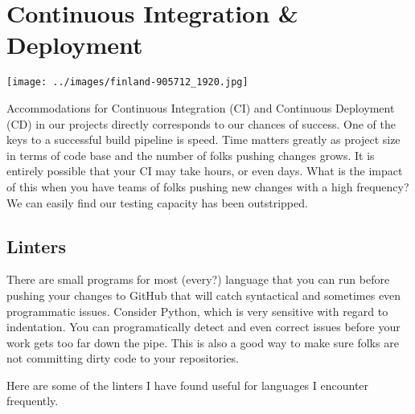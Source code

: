\chapter{Continuous Integration \& Deployment}

\texttt{[image: ../images/finland-905712\_1920.jpg]}

\justify
Accommodations for Continuous Integration (CI) and Continuous Deployment
(CD) in our projects directly corresponds to our chances of success. One of the keys to 
a successful build pipeline is speed. Time matters greatly as project size in terms of
code base and the number of folks pushing changes grows. It is entirely possible that
your CI may take hours, or even days. What is the impact of this when you have teams
of folks pushing new changes with a high frequency? We can easily find our testing
capacity has been outstripped. 

\section{Linters}

\justify
There are small programs for most (every?) language that you can run before
pushing your changes to GitHub that will catch syntactical and sometimes
even programmatic issues. Consider Python, which is very sensitive with
regard to indentation. You can programatically detect and even correct issues
before your work gets too far down the pipe. This is also a good way to
make sure folks are not committing dirty code to your repositories.

\justify
Here are some of the linters I have found useful for languages I encounter
frequently.



